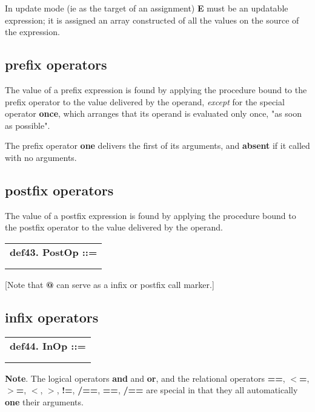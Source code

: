 \documentclass{report}
\begin{document}
In update mode (ie as the target of an assignment) {\bf E} must be an
updatable expression; it is assigned an array constructed of all the
values on the source of the expression.\subsection{prefix operators}


The value of a prefix expression is found by applying the procedure
bound to the prefix operator to the value delivered by the operand,
{\em except} for the special operator {\bf once}, which arranges that its
operand is evaluated only once, "as soon as possible".

The prefix operator {\bf one} delivers the first of its arguments, and
{\bf absent} if it called with no arguments.\subsection{postfix operators}


The value of a postfix expression is found by applying the procedure
bound to the postfix operator to the value delivered by the operand.

\begin{tabular}{l}
{\bf def43. PostOp ::= }\\ 
\hspace*{3mm}{\tt LexicalPostfixOperator} \\ 
\hspace*{3mm}{\tt  $\mid$ "@" DotExpr} \\ 
\end{tabular}

{[}Note that {\bf @} can serve as a infix or postfix call marker.{]}\subsection{infix operators}


\begin{tabular}{l}
{\bf def44. InOp ::= }\\ 
\hspace*{3mm}{\tt LexicalInfixOperator} \\ 
\hspace*{3mm}{\tt  $\mid$ "@" DotExpr} \\ 
\end{tabular}

{\bf Note}. The logical operators {\bf and} and {\bf or}, and the relational operators
{\bf ==}, {\bf $<$=}, {\bf $>$=}, {\bf $<$}, {\bf $>$}, {\bf !=}, {\bf /==}, {\bf ==}, {\bf /==} are special in that
they all automatically {\bf one} their arguments.
\end{document}
